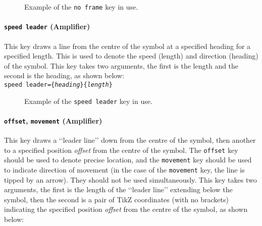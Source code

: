 \documentclass[a4paper, titlepage]{article}
\begin{document}
\begin{figure}[H]
\centering
{}
\caption{Example of the \texttt{no frame} key in use.}
\end{figure}

\paragraph{\texttt{speed leader} (Amplifier)}

This key draws a line from the centre of the symbol at a specified heading for a specified length. This is used to denote the speed (length) and direction (heading) of the symbol. This key takes two arguments, the first is the length and the second is the heading, as shown below:\\

\texttt{speed leader=\{\textit{heading}\}\{\textit{length}\}}

\begin{figure}[H]
\centering
{}
\caption{Example of the \texttt{speed leader} key in use.}
\end{figure}

\paragraph{\texttt{offset}, \texttt{movement} (Amplifier)}

This key draws a \lq\lq{}leader line\rq\rq{} down from the centre of the symbol, then another to a specified position \textit{offset} from the centre of the symbol. The \texttt{offset} key should be used to denote precise location, and the \texttt{movement} key should be used to indicate direction of movement (in the case of the \texttt{movement} key, the line is tipped by an arrow). They should not be used simultaneously. This key takes two arguments, the first is the length of the \lq\lq{}leader line\rq\rq{} extending below the symbol, then the second is a pair of TikZ coordinates (with no brackets) indicating the specified position \textit{offset} from the centre of the symbol, as shown below:\\
\end{document}
